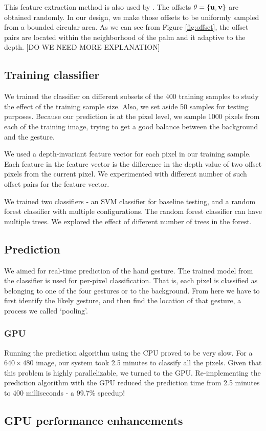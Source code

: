 This feature extraction method is also used by \cite{shotton2011}. The offsets $\theta=\{\bf{u}, \bf{v} \}$ are obtained randomly. In our design, we make those offsets to be uniformly sampled from a bounded circular area. As we can see from Figure \ref{fig:offset}, the offset pairs are located within the neighborhood of the palm and it adaptive to the depth.  
[DO WE NEED MORE EXPLANATION]



\subsection{Training classifier}
We trained the classifier on different subsets of the 400 training samples to study the effect of the training sample size. Also, we set aside 50 samples for testing purposes. Because our prediction is at the pixel level, we sample 1000 pixels from each of the training image, trying to get a good balance between the background and the gesture.

We used a depth-invariant feature vector for each pixel in our training sample. Each feature in the feature vector is the difference in the depth value of two offset pixels from the current pixel. We experimented with different number of such offset pairs for the feature vector.

We trained two classifiers - an SVM classifier for baseline testing, and a random forest classifier with multiple configurations. The random forest classifier can have multiple trees. We explored the effect of different number of trees in the forest.

\subsection{Prediction}
We aimed for real-time prediction of the hand gesture. The trained model from the classifier is used for per-pixel classification. That is, each pixel is classified as belonging to one of the four gestures or to the background. From here we have to first identify the likely gesture, and then find the location of that gesture, a process we called `pooling'. 

\subsubsection{GPU} Running the prediction algorithm using the CPU proved to be very slow. For a $640\times480$ image, our system took 2.5 minutes to classify all the pixels. Given that this problem is highly parallelizable, we turned to the GPU. Re-implementing the prediction algorithm with the GPU reduced the prediction time from 2.5 minutes to 400 milliseconds - a 99.7\% speedup!


\subsection{GPU performance enhancements}